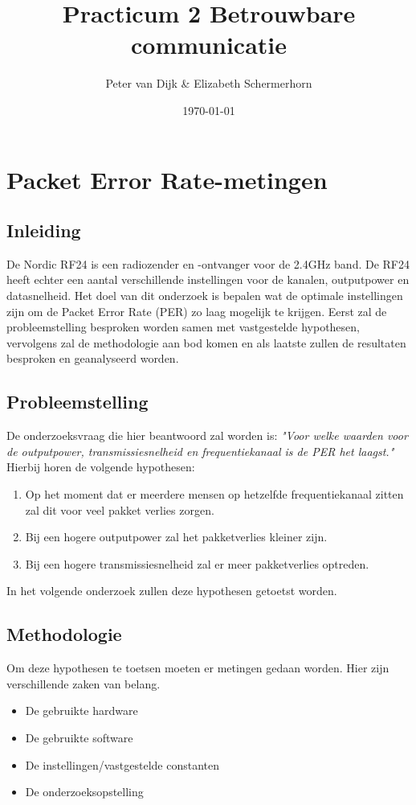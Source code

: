 \documentclass{article}
\author{Peter van Dijk \& Elizabeth Schermerhorn}
\date{\today}
\title{Practicum 2 Betrouwbare communicatie}
\begin{document}
\maketitle
\newpage
\tableofcontents
\clearpage
\section{Packet Error Rate-metingen}
\subsection{Inleiding}
De Nordic RF24 is een radiozender en -ontvanger voor de 2.4GHz band. De RF24 heeft echter een aantal verschillende instellingen voor de kanalen, outputpower en datasnelheid. Het doel van dit onderzoek is bepalen wat de optimale instellingen zijn om de Packet Error Rate (PER) zo laag mogelijk te krijgen. Eerst zal de probleemstelling besproken worden samen met vastgestelde hypothesen, vervolgens zal de methodologie aan bod komen en als laatste zullen de resultaten besproken en geanalyseerd worden. 

\subsection{Probleemstelling}
De onderzoeksvraag die hier beantwoord zal worden is: \textit{"Voor welke waarden voor de outputpower, transmissiesnelheid en frequentiekanaal is de PER het laagst."} Hierbij horen de volgende hypothesen: 
\begin{enumerate}
  \item Op het moment dat er meerdere mensen op hetzelfde frequentiekanaal zitten zal dit voor veel pakket verlies zorgen.
  \item Bij een hogere outputpower zal het pakketverlies kleiner zijn.
  \item Bij een hogere transmissiesnelheid zal er meer pakketverlies optreden. 
\end{enumerate}
In het volgende onderzoek zullen deze hypothesen getoetst worden.
\subsection{Methodologie}
Om deze hypothesen te toetsen moeten er metingen gedaan worden. Hier zijn verschillende zaken van belang. 
\begin{itemize}
	\item De gebruikte hardware
	\item De gebruikte software
	\item De instellingen/vastgestelde constanten
	\item De onderzoeksopstelling
\end{itemize}
\end{document}
